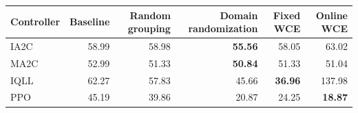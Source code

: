 \begin{tabular}{lrrrrr}
\hline
Controller & Baseline & Random grouping & Domain randomization & Fixed WCE & Online WCE \\
\hline
IA2C & 58.99 & 58.98 & \textbf{55.56} & 58.05 & 63.02 \\
MA2C & 52.99 & 51.33 & \textbf{50.84} & 51.33 & 51.04 \\
IQLL & 62.27 & 57.83 & 45.66 & \textbf{36.96} & 137.98 \\
PPO & 45.19 & 39.86 & 20.87 & 24.25 & \textbf{18.87} \\
\hline
\end{tabular}
